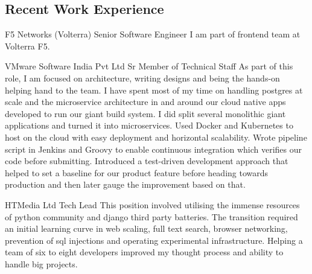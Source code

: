 \documentclass[10pt]{article} %
\begin{document}
\begin{paracol}{2}
\section{Recent Work Experience}





{} %
{F5 Networks (Volterra)} %
{Senior Software Engineer} %
    {I am part of frontend team at Volterra F5.} %


{} %
{VMware Software India Pvt Ltd} %
{Sr Member of Technical Staff} %
    {As part of this role, I am focused on architecture, writing designs and being the hands-on helping hand to the team.}
    {I have spent most of my time on handling postgres at scale and the microservice architecture in and around our cloud native apps developed to run our giant build system.}
    {I did split several monolithic giant applications and turned it into microservices. Used Docker and Kubernetes to host on the cloud with easy deployment and horizontal scalability.}
    {Wrote pipeline script in Jenkins and Groovy to enable continuous integration which verifies our code before submitting.}
    {Introduced a test-driven development approach that helped to set a baseline for our product feature before heading towards production and then later gauge the improvement based on that.} %


{} %
{HTMedia Ltd} %
{Tech Lead} %
{This position involved utilising the immense resources of python community and django third party batteries. The transition required an initial learning curve in web scaling, full text search, browser networking, prevention of sql injections and operating experimental infrastructure. Helping a team of six to eight developers improved my thought process and ability to handle big projects.}  %


\end{paracol}
\end{document}
